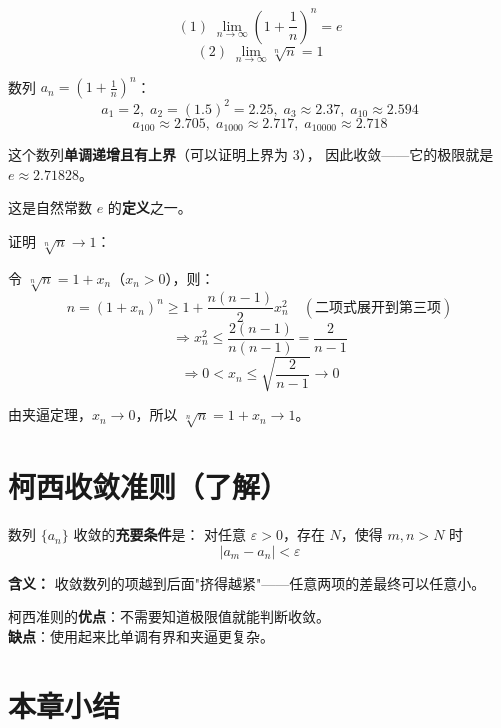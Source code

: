 \begin{theorembox}[两个重要极限]
\[
(1)\; \lim_{n\to\infty} \left(1 + \frac{1}{n}\right)^n = e
\]
\[
(2)\; \lim_{n\to\infty} \sqrt[n]{n} = 1
\]
\end{theorembox}

\begin{examplebox}
数列 \(a_n = \left(1 + \frac{1}{n}\right)^n\)：
\[
a_1 = 2,\; a_2 = (1.5)^2 = 2.25,\; a_3 \approx 2.37,\; a_{10} \approx 2.594
\]
\[
a_{100} \approx 2.705,\; a_{1000} \approx 2.717,\; a_{10000} \approx 2.718
\]

这个数列\textbf{单调递增且有上界}（可以证明上界为 3），
因此收敛——它的极限就是 \(e \approx 2.71828\)。

这是自然常数 \(e\) 的\textbf{定义}之一。
\end{examplebox}

\begin{examplebox}[8——第二个重要极限]
证明 \(\sqrt[n]{n} \to 1\)：

令 \(\sqrt[n]{n} = 1 + x_n\)（\(x_n > 0\)），则：
\[
n = (1 + x_n)^n \ge 1 + \frac{n(n-1)}{2}x_n^2 \quad (\text{二项式展开到第三项})
\]
\[
\Rightarrow x_n^2 \le \frac{2(n-1)}{n(n-1)} = \frac{2}{n-1}
\]
\[
\Rightarrow 0 < x_n \le \sqrt{\frac{2}{n-1}} \to 0
\]

由夹逼定理，\(x_n \to 0\)，所以 \(\sqrt[n]{n} = 1 + x_n \to 1\)。
\end{examplebox}


\section{柯西收敛准则（了解）}

\begin{theorembox}[柯西收敛准则]
数列 \(\{a_n\}\) 收敛的\textbf{充要条件}是：
对任意 \(\varepsilon > 0\)，存在 \(N\)，使得 \(m, n > N\) 时
\[
|a_m - a_n| < \varepsilon
\]
\end{theorembox}

\textbf{含义：} 收敛数列的项越到后面"挤得越紧"——任意两项的差最终可以任意小。

柯西准则的\textbf{优点}：不需要知道极限值就能判断收敛。\\
\textbf{缺点}：使用起来比单调有界和夹逼更复杂。


\section{本章小结}

